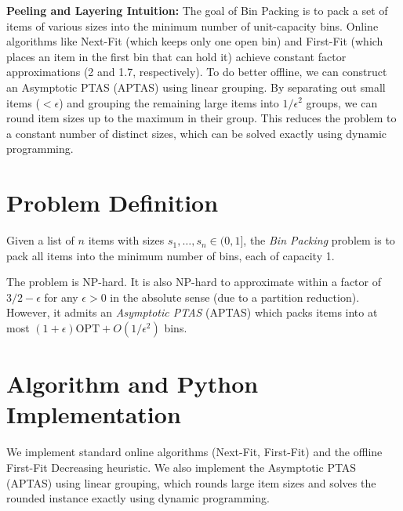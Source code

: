 \documentclass[11pt,oneside]{book}
\begin{document}
\begin{intuitionbox}
\textbf{Peeling and Layering Intuition:} The goal of Bin Packing is to pack a set of items of various sizes into the minimum number of unit-capacity bins. Online algorithms like Next-Fit (which keeps only one open bin) and First-Fit (which places an item in the first bin that can hold it) achieve constant factor approximations (2 and 1.7, respectively). To do better offline, we can construct an Asymptotic PTAS (APTAS) using linear grouping. By separating out small items ($<\epsilon$) and grouping the remaining large items into $1/\epsilon^2$ groups, we can round item sizes up to the maximum in their group. This reduces the problem to a constant number of distinct sizes, which can be solved exactly using dynamic programming.
\end{intuitionbox}

\section{Problem Definition}
Given a list of $n$ items with sizes $s_1, \dots, s_n \in (0, 1]$, the \emph{Bin Packing} problem is to pack all items into the minimum number of bins, each of capacity 1.

The problem is NP-hard. It is also NP-hard to approximate within a factor of $3/2 - \epsilon$ for any $\epsilon > 0$ in the absolute sense (due to a partition reduction). However, it admits an \emph{Asymptotic PTAS} (APTAS) which packs items into at most $(1 + \epsilon)\text{OPT} + O(1/\epsilon^2)$ bins.

\section{Algorithm and Python Implementation}
We implement standard online algorithms (Next-Fit, First-Fit) and the offline First-Fit Decreasing heuristic. We also implement the Asymptotic PTAS (APTAS) using linear grouping, which rounds large item sizes and solves the rounded instance exactly using dynamic programming.
\end{document}
